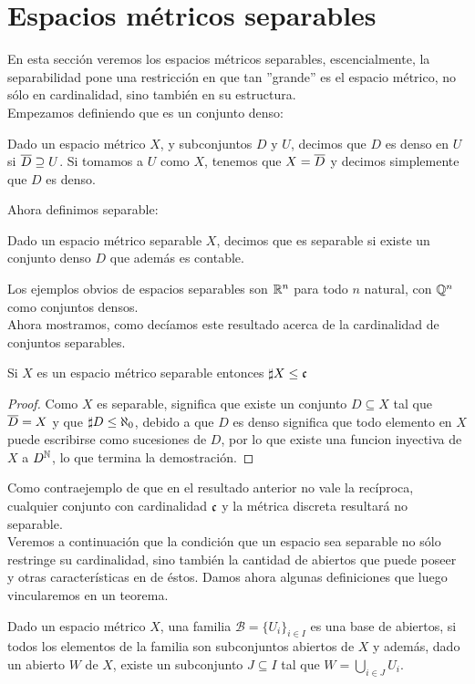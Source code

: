 \documentclass[12pt,a4paper]{book}
\begin{document}
\else
\fi
\section{Espacios métricos separables}
En esta sección veremos los espacios métricos separables, escencialmente, la separabilidad pone una restricción en que tan ''grande'' es el espacio métrico, no sólo en cardinalidad, sino también en su estructura.\\
Empezamos definiendo que es un conjunto denso:
\begin{defi}
Dado un espacio métrico $X$, y subconjuntos $D$ y $U$, decimos que $D$ es denso en $U$ si $\overline{D} \supseteq U$. Si tomamos a $U$ como $X$, tenemos que $X = \overline{D}$ y decimos simplemente que $D$ es denso.
\end{defi}
Ahora definimos separable:
\begin{defi}
Dado un espacio métrico separable $X$, decimos que es separable si existe un conjunto denso $D$ que además es contable.
\end{defi}
Los ejemplos obvios de espacios separables son $\mathbb{R}^n$ para todo $n$ natural, con $\mathbb{Q}^n$ como conjuntos densos.\\[0.5cm]
Ahora mostramos, como decíamos este resultado acerca de la cardinalidad de conjuntos separables.
\begin{prop}
Si $X$ es un espacio métrico separable entonces $\sharp X \leq \mathfrak{c}$
\begin{proof}
Como $X$ es separable, significa que existe un conjunto $D \subseteq X$ tal que $ \overline{D} = X$ y que $\sharp D \leq \a0$, debido a que $D$ es denso significa que todo elemento en $X$ puede escribirse como sucesiones de $D$, por lo que existe una funcion inyectiva de $X$ a $D^{\mathbb{N}}$, lo que termina la demostración.
\end{proof}
\end{prop}
Como contraejemplo de que en el resultado anterior no vale la recíproca, cualquier conjunto con cardinalidad $\mathfrak{c}$ y la métrica discreta resultará no separable.\\[0.5cm]
Veremos a continuación que la condición que un espacio sea separable no sólo restringe su cardinalidad, sino también la cantidad de abiertos que puede poseer y otras características en de éstos. Damos ahora algunas definiciones que luego vincularemos en un teorema.
\begin{defi}
Dado un espacio métrico $X$, una familia $\mathcal{B} = \{U_i\}_{i \in I}$ es una base de abiertos, si todos los elementos de la familia son subconjuntos abiertos de $X$ y además, dado un abierto $W$ de $X$, existe un subconjunto $J \subseteq I$ tal que $ W = \bigcup_{i \in J} U_i$.
\end{defi}
\end{document}
